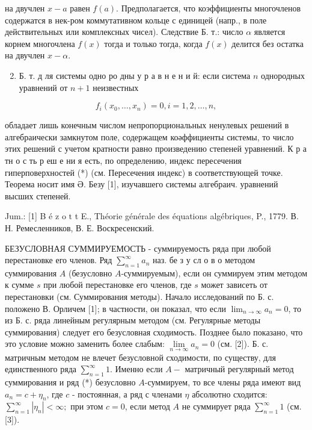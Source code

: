 \documentclass[10pt]{article}
\begin{document}
на двучлен $x-a$ равен $f(a)$. Предполагается, что коэффициенты многочленов содержатся в нек-ром коммутативном кольце с единицей (напр., в поле действительных или комплексных чисел). Следствие Б. т.: число $\alpha$ является корнем многочлена $f(x)$ тогда и только тогда, когда $f(x)$ делится без остатка на двучлен $x-\alpha$.



\begin{enumerate}

  \setcounter{enumi}{1}

  \item Б. т. д ля системы одно ро дны у р а в н е н и й: если система $n$ однородных уравнений от $n+1$ неизвестных

\end{enumerate}



\[

f_{i}\left(x_{0}, \ldots, x_{n}\right)=0, i=1,2, \ldots, n,

\]



обладает лишь конечным числом непропорциональных ненулевых решений в алгебраически замкнутом поле, содержащем коәффициенты системы, то число этих решений с учетом кратности равно произведению степеней уравнений. К р а тн о с ть р еш е ни я есть, по определению, индекс пересечения гиперповерхностей (*) (см. Пересечения индекс) в соответствующей точке. Теорема носит имя Ә. Безу [1], изучавшего системы алгебраич. уравнений высших степеней.



Jum.: [1] B é $\mathrm{z}$ o $\mathrm{t}$ t E., Théorie générale des équations algébriques, P., 1779. В. Н. Ремесленников, В. Е. Воскресенский.



БЕЗУСЛОВНАЯ СУММИРУЕМОСТЬ - суммируемость ряда при любой перестановке его членов. Ряд $\sum_{n=1}^{\infty} a_{n}$ наз. бе з у сл о в о методом суммирования $A$ (безусловно $A$-суммируемым), если он суммируем этим методом к сумме $s$ при любой перестановке его членов, где $s$ может зависеть от перестановки (см. Суммирования методы). Начало исследований по Б. с. положено В. Орличем [1]; в частности, он показал, что если $\lim _{n \rightarrow \infty} a_{n}=0$, то из Б. с. ряда линейным регулярным методом (см. Регулярные методы суммирования) следует его безусловная сходимость. Позднее было показано, что это условие можно заменить более слабым: $\underset{n \rightarrow \infty}{\lim } a_{n}=0$ (см. [2]). Б. с. матричным методом не влечет безусловной сходимости, по существу, для единственного ряда $\sum_{n=1}^{\infty} 1$. Именно если $A-$ матричный регулярный метод суммирования и ряд (*) безусловно $A$-суммируем, то все члены ряда имеют вид $a_{n}=c+\eta_{n}$, где $c$ - постоянная, а ряд с членами $\eta$ абсолютно сходится: $\sum_{n=1}^{\infty}\left|\eta_{n}\right|<\infty ;$ при этом $c=0$, если метод $A$ не суммирует ряда $\sum_{n=1}^{\infty} 1$ (см. [3]).
\end{document}
